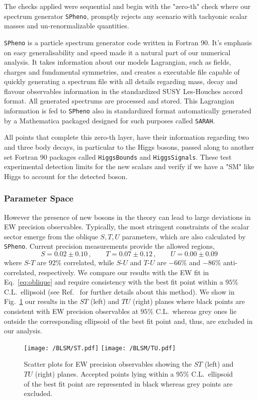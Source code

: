 The checks applied were sequential and begin with the "zero-th" check where our spectrum generator \texttt{SPheno}, promptly rejects any scenario with tachyonic scalar masses and un-renormalizable quantities.  

\texttt{SPheno} is a particle spectrum generator code written in Fortran 90. It's emphasis on easy generalisability and speed made it a natural part of our numerical analysis. It takes information about our models Lagrangian, such as fields, charges and fundamental symmetries, and creates a executable file capable of quickly generating a spectrum file with all details regarding mass, decay and flavour observables information in the standardized SUSY Les-Houches accord format. All generated spectrums are processed and stored. 
%
This Lagrangian information is fed to \texttt{SPheno} also in standardized format automatically generated by a Mathematica packaged designed for such purposes called \texttt{SARAH}. 

All points that complete this zero-th layer, have their information regarding two and three body decays, in particular to the Higgs bosons, passed along to another set Fortran 90 packages called \texttt{HiggsBounds} and \texttt{HiggsSignals}. These test experimental detection limits for the new scalars and verify if we have a "SM" like Higgs to account for the detected boson. 

\subsubsection{Parameter Space}

However the presence of new bosons in the theory can lead to large deviations in EW precision observables. Typically, the most stringent constraints of the scalar sector emerge from the oblique $S,T,U$ parameters, which are also calculated by \texttt{SPheno}. Current precision measurements provide the allowed regions,
%
\begin{equation}
	S = 0.02 \pm 0.10\,, \qquad T = 0.07 \pm 0.12\,, \qquad U = 0.00 \pm 0.09
	\label{eq:oblique}
\end{equation}
%
where $S$-$T$ are $92\%$ correlated, while $S$-$U$ and $T$-$U$ are $-66\%$ and $-86\%$ anti-correlated, respectively.
%
We compare our results with the EW fit in Eq.~\eqref{eq:oblique} and require consistency with the best fit point within a $95\%$ C.L.~ellipsoid (see Ref.~\cite{Costa:2014qga} for further details about this method). We show in Fig.~\ref{fig:STU} our results in the $ST$ (left) and $TU$ (right) planes where black points are consistent with EW precision observables at $95\%$ C.L.~whereas grey ones lie outside the corresponding ellipsoid of the best fit point and, thus, are excluded in our analysis. 
\begin{figure}[H]
	\centering
	\texttt{[image: /BLSM/ST.pdf]}
	\texttt{[image: /BLSM/TU.pdf]}
	\caption{Scatter plots for EW precision observables showing the $ST$ (left) and $TU$ (right) planes. Accepted points lying within a $95\%$ C.L.~ellipsoid of the best fit point are represented in black whereas grey points are excluded.}
	\label{fig:STU}
\end{figure}	

